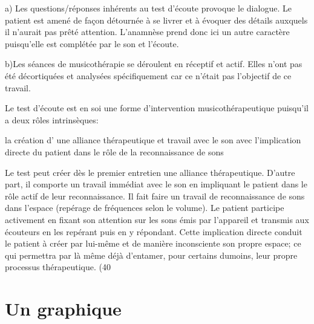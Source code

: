  a) Les questions/réponses inhérents au 
 test d'écoute provoque le dialogue. Le patient est amené de façon
 détournée à se livrer et à évoquer des détails auxquels il
 n'aurait pas prêté attention. L'anamnèse prend donc ici un autre
 caractère puisqu'elle est complétée par le son et l'écoute.

 b)Les séances de musicothérapie se déroulent en
réceptif et actif. Elles n'ont pas été décortiquées et analysées
spécifiquement car ce n'était pas l'objectif de ce travail.		
        
 Le test d'écoute est en soi une forme d'intervention
 musicothérapeutique puisqu'il 
 a deux rôles intrinsèques:

 la création d' une alliance thérapeutique et
     travail avec le son avec l'implication directe du
     patient dans le rôle de la 
     reconnaissance de sons
   
 Le test peut créer dès le premier entretien une alliance thérapeutique.
 D'autre part, il comporte un travail immédiat avec le son en impliquant le patient
 dans le rôle actif de leur reconnaissance. Il fait faire un travail de reconnaissance de sons dans
 l'espace (repérage de fréquences selon le volume). Le patient
 participe activement en fixant son attention sur les
 sons émis par l'appareil et transmis aux écouteurs en les repérant
  puis en y
 répondant. Cette implication directe conduit le patient à créer par lui-même et de manière
 inconsciente  
 son propre espace; ce  qui permettra par là même déjà d'entamer, pour certains dumoins, leur propre
 processus thérapeutique. (40%
 
 	
 	
       

 	
 	\section{Un graphique}


